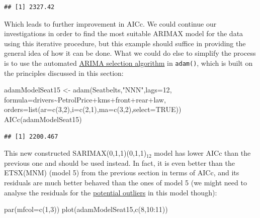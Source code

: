 \documentclass[
]{book}
\newenvironment{Shaded}{\begin{snugshade}}{\end{snugshade}}
\newcommand{\AttributeTok}[1]{\textcolor[rgb]{0.77,0.63,0.00}{#1}}
\newcommand{\ConstantTok}[1]{\textcolor[rgb]{0.00,0.00,0.00}{#1}}
\newcommand{\DecValTok}[1]{\textcolor[rgb]{0.00,0.00,0.81}{#1}}
\newcommand{\FunctionTok}[1]{\textcolor[rgb]{0.00,0.00,0.00}{#1}}
\newcommand{\NormalTok}[1]{#1}
\newcommand{\OtherTok}[1]{\textcolor[rgb]{0.56,0.35,0.01}{#1}}
\newcommand{\SpecialCharTok}[1]{\textcolor[rgb]{0.00,0.00,0.00}{#1}}
\newcommand{\StringTok}[1]{\textcolor[rgb]{0.31,0.60,0.02}{#1}}
\theoremstyle{definition}
\theoremstyle{definition}
\theoremstyle{definition}
\theoremstyle{definition}
\theoremstyle{remark}
\begin{document}
\begin{verbatim}
## [1] 2327.42
\end{verbatim}

Which leads to further improvement in AICc. We could continue our investigations in order to find the most suitable ARIMAX model for the data using this iterative procedure, but this example should suffice in providing the general idea of how it can be done. What we could do else to simplify the process is to use the automated \protect\hyperlink{ARIMASelection}{ARIMA selection algorithm} in \texttt{adam()}, which is built on the principles discussed in this section:

\begin{Shaded}
\begin{Highlighting}[]
\NormalTok{adamModelSeat15 }\OtherTok{\textless{}{-}}
  \FunctionTok{adam}\NormalTok{(Seatbelts,}\StringTok{"NNN"}\NormalTok{,}\AttributeTok{lags=}\DecValTok{12}\NormalTok{,}
       \AttributeTok{formula=}\NormalTok{drivers}\SpecialCharTok{\textasciitilde{}}\NormalTok{PetrolPrice}\SpecialCharTok{+}\NormalTok{kms}\SpecialCharTok{+}\NormalTok{front}\SpecialCharTok{+}\NormalTok{rear}\SpecialCharTok{+}\NormalTok{law,}
       \AttributeTok{orders=}\FunctionTok{list}\NormalTok{(}\AttributeTok{ar=}\FunctionTok{c}\NormalTok{(}\DecValTok{3}\NormalTok{,}\DecValTok{2}\NormalTok{),}\AttributeTok{i=}\FunctionTok{c}\NormalTok{(}\DecValTok{2}\NormalTok{,}\DecValTok{1}\NormalTok{),}\AttributeTok{ma=}\FunctionTok{c}\NormalTok{(}\DecValTok{3}\NormalTok{,}\DecValTok{2}\NormalTok{),}\AttributeTok{select=}\ConstantTok{TRUE}\NormalTok{))}
\FunctionTok{AICc}\NormalTok{(adamModelSeat15)}
\end{Highlighting}
\end{Shaded}

\begin{verbatim}
## [1] 2200.467
\end{verbatim}

This new constructed SARIMAX(0,1,1)(0,1,1)\(_{12}\) model has lower AICc than the previous one and should be used instead. In fact, it is even better than the ETSX(MNM) (model 5) from the previous section in terms of AICc, and its residuals are much better behaved than the ones of model 5 (we might need to analyse the residuals for the \protect\hyperlink{diagnosticsOutliers}{potential outliers} in this model though):

\begin{Shaded}
\begin{Highlighting}[]
\FunctionTok{par}\NormalTok{(}\AttributeTok{mfcol=}\FunctionTok{c}\NormalTok{(}\DecValTok{1}\NormalTok{,}\DecValTok{3}\NormalTok{))}
\FunctionTok{plot}\NormalTok{(adamModelSeat15,}\FunctionTok{c}\NormalTok{(}\DecValTok{8}\NormalTok{,}\DecValTok{10}\SpecialCharTok{:}\DecValTok{11}\NormalTok{))}
\end{Highlighting}
\end{Shaded}
\end{document}
